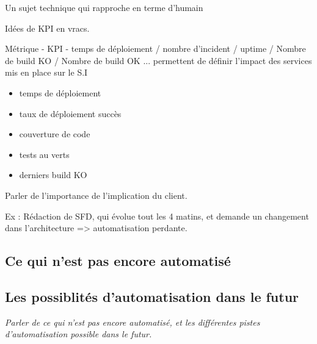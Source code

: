 Un sujet technique qui rapproche en terme d'humain

Idées de \gls{KPI} en vracs.

Métrique - KPI - temps de déploiement / nombre d'incident / uptime / Nombre de build KO / Nombre de build OK ... permettent de définir l'impact des services mis en place sur le S.I

\begin{itemize}
	\item temps de déploiement
	\item taux de déploiement succès
	\item couverture de code
	\item tests au verts
	\item derniers build KO
\end{itemize}

Parler de l'importance de l'implication du client. 

Ex :  Rédaction de SFD, qui évolue tout les 4 matins, et demande un changement dans l'architecture => automatisation perdante.

\subsection{Ce qui n'est pas encore automatisé}

\subsection{Les possiblités d'automatisation dans le futur}

\textit{Parler de ce qui n'est pas encore automatisé, et les différentes pistes d'automatisation possible dans le futur.}


